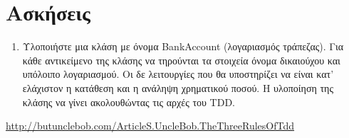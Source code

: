 



\section*{Ασκήσεις}
\begin{enumerate}
\item Υλοποιήστε μια κλάση με όνομα BankAccount (λογαριασμός τράπεζας). Για κάθε αντικείμενο της κλάσης να τηρούνται τα στοιχεία όνομα δικαιούχου και υπόλοιπο λογαριασμού. Οι δε λειτουργίες που θα υποστηρίζει να είναι κατ' ελάχιστον η κατάθεση και η ανάληψη χρηματικού ποσού. Η υλοποίηση της κλάσης να γίνει ακολουθώντας τις αρχές του TDD.
\end{enumerate}

\begin{thebibliography}{9}

\href{http://butunclebob.com/ArticleS.UncleBob.TheThreeRulesOfTdd}{http://butunclebob.com/ArticleS.UncleBob.TheThreeRulesOfTdd}

\end{thebibliography}

